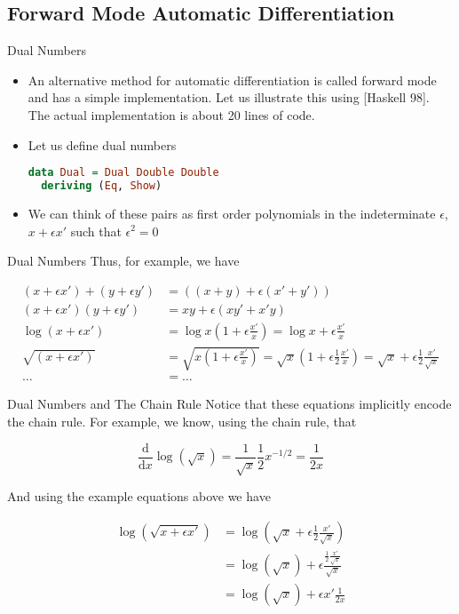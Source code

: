 \documentclass{beamer}
\begin{document}
\subsection{Forward Mode Automatic Differentiation}

\begin{frame}[fragile]{Dual Numbers}
\begin{itemize}
\item
An alternative method for automatic differentiation is called forward
mode and has a simple implementation. Let us illustrate this using
[Haskell 98]. The actual implementation is about 20 lines of code.
\item
Let us define dual numbers

\begin{lstlisting}[language=Haskell]
data Dual = Dual Double Double
  deriving (Eq, Show)
\end{lstlisting}
\item
We can think of these pairs as first order polynomials in the
indeterminate $\epsilon$, $x + \epsilon x'$ such that $\epsilon^2 = 0$
\end{itemize}
\end{frame}

\begin{frame}[fragile]{Dual Numbers}
Thus, for example, we have

$$
\begin{aligned}
(x + \epsilon x') + (y + \epsilon y') &= ((x + y) + \epsilon (x' + y')) \\
(x + \epsilon x')(y + \epsilon y') &= xy + \epsilon (xy' + x'y) \\
\log (x + \epsilon x') &=
\log x (1 + \epsilon \frac {x'}{x}) =
\log x + \epsilon\frac{x'}{x} \\
\sqrt{(x + \epsilon x')} &=
\sqrt{x(1 + \epsilon\frac{x'}{x})} =
\sqrt{x}(1 + \epsilon\frac{1}{2}\frac{x'}{x}) =
\sqrt{x} + \epsilon\frac{1}{2}\frac{x'}{\sqrt{x}} \\
\ldots &= \ldots
\end{aligned}
$$
\end{frame}

\begin{frame}[fragile]{Dual Numbers and The Chain Rule}
Notice that these equations implicitly encode the chain rule. For
example, we know, using the chain rule, that

$$
\frac{\mathrm{d}}{\mathrm{d} x}\log(\sqrt x) =
\frac{1}{\sqrt x}\frac{1}{2}x^{-1/2} =
\frac{1}{2x}
$$

And using the example equations above we have

$$
\begin{aligned}
\log(\sqrt {x + \epsilon x'}) &= \log (\sqrt{x} + \epsilon\frac{1}{2}\frac{x'}{\sqrt{x}}) \\
                              &= \log (\sqrt{x}) + \epsilon\frac{\frac{1}{2}\frac{x'}{\sqrt{x}}}{\sqrt{x}} \\
                              &= \log (\sqrt{x}) + \epsilon x'\frac{1}{2x}
\end{aligned}
$$
\end{frame}
\end{document}
